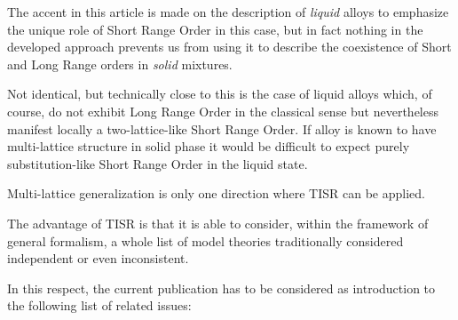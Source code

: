 \documentclass[12pt,abstract]{scrartcl}
\begin{document}
The accent in this article is made on the description of \textit{liquid} alloys to emphasize  the unique role of  Short Range Order in this case, but in fact nothing in the developed approach prevents us from using it to describe the coexistence of Short and Long Range orders in \textit{solid} mixtures. 

Not identical, but technically close to this is the case of liquid alloys which, of course,  do not exhibit  Long Range Order in the classical sense but nevertheless manifest locally a two-lattice-like Short Range Order. If  alloy is known to have multi-lattice structure in solid phase it would be difficult to expect purely substitution-like Short Range Order in the liquid state.

Multi-lattice generalization is only one direction where TISR can be applied.

The advantage of TISR is that it is able to consider, within the framework of general formalism, a whole list of model theories traditionally considered independent or even inconsistent.

In this respect, the current publication has to be considered as introduction to the following list of related issues:
\end{document}
